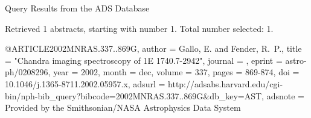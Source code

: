 Query Results from the ADS Database


Retrieved 1 abstracts, starting with number 1.  Total number selected: 1.

@ARTICLE{2002MNRAS.337..869G,
   author = {{Gallo}, E. and {Fender}, R.~P.},
    title = "{Chandra imaging spectroscopy of 1E 1740.7-2942}",
  journal = {\mnras},
   eprint = {astro-ph/0208296},
     year = 2002,
    month = dec,
   volume = 337,
    pages = {869-874},
      doi = {10.1046/j.1365-8711.2002.05957.x},
   adsurl = {http://adsabs.harvard.edu/cgi-bin/nph-bib_query?bibcode=2002MNRAS.337..869G&db_key=AST},
  adsnote = {Provided by the Smithsonian/NASA Astrophysics Data System}
}


